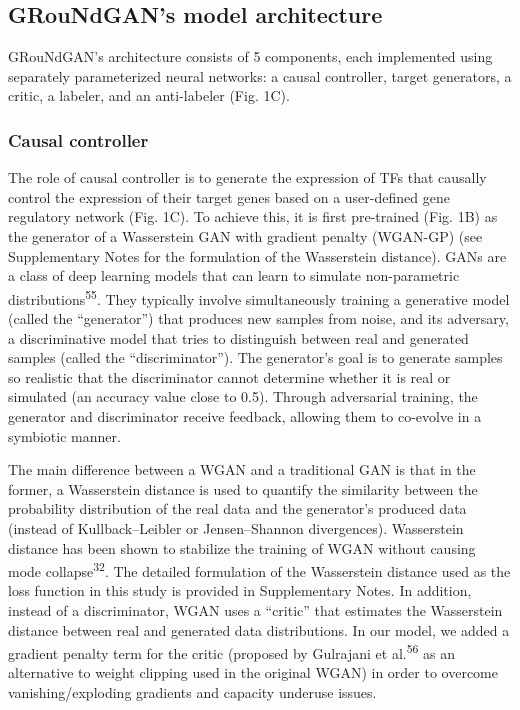 \subsection*{GRouNdGAN’s model architecture}
GRouNdGAN’s architecture consists of 5 components, each implemented using separately parameterized neural networks: a causal controller, target generators, a critic, a labeler, and an anti-labeler (Fig. 1C).

\subsubsection*{Causal controller}

The role of causal controller is to generate the expression of TFs that causally control the expression of their target genes based on a user-defined gene regulatory network (Fig. 1C). To achieve this, it is first pre-trained (Fig. 1B) as the generator of a Wasserstein GAN with gradient penalty (WGAN-GP) (see Supplementary Notes for the formulation of the Wasserstein distance). GANs are a class of deep learning models that can learn to simulate non-parametric distributions\textsuperscript{55}. They typically involve simultaneously training a generative model (called the “generator”) that produces new samples from noise, and its adversary, a discriminative model that tries to distinguish between real and generated samples (called the “discriminator”). The generator’s goal is to generate samples so realistic that the discriminator cannot determine whether it is real or simulated (an accuracy value close to 0.5). Through adversarial training, the generator and discriminator receive feedback, allowing them to co-evolve in a symbiotic manner.

The main difference between a WGAN and a traditional GAN is that in the former, a Wasserstein distance is used to quantify the similarity between the probability distribution of the real data and the generator’s produced data (instead of Kullback–Leibler or Jensen–Shannon divergences). Wasserstein distance has been shown to stabilize the training of WGAN without causing mode collapse\textsuperscript{32}. The detailed formulation of the Wasserstein distance used as the loss function in this study is provided in Supplementary Notes. In addition, instead of a discriminator, WGAN uses a “critic” that estimates the Wasserstein distance between real and generated data distributions. In our model, we added a gradient penalty term for the critic (proposed by Gulrajani et al.\textsuperscript{56} as an alternative to weight clipping used in the original WGAN) in order to overcome vanishing/exploding gradients and capacity underuse issues.

